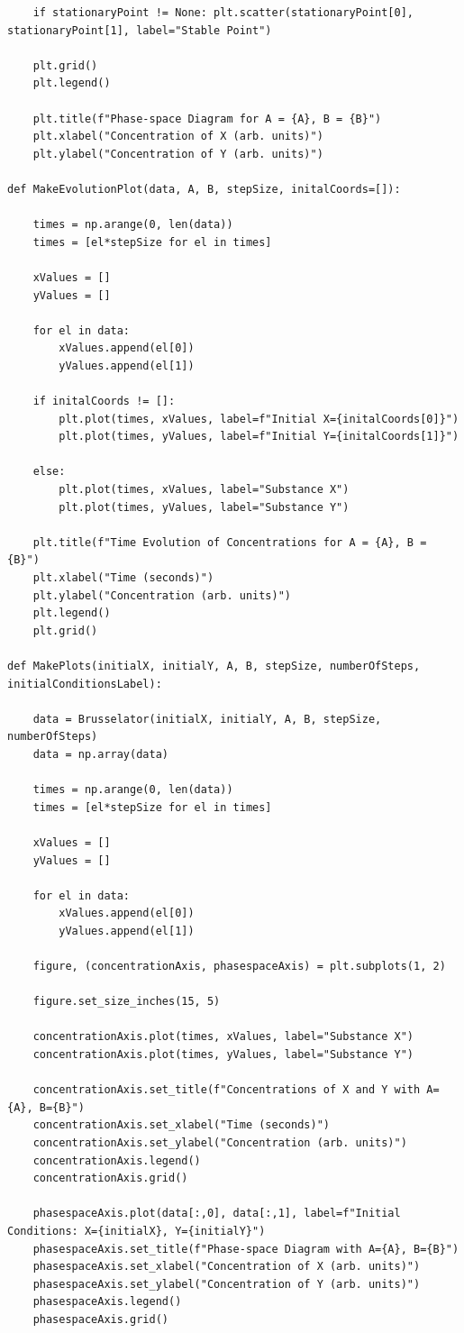 \documentclass[reprint, amsmath, amssymb, aps]{revtex4-2}
\begin{document}
\begin{lstlisting}
    if stationaryPoint != None: plt.scatter(stationaryPoint[0], stationaryPoint[1], label="Stable Point")

    plt.grid()
    plt.legend()

    plt.title(f"Phase-space Diagram for A = {A}, B = {B}")
    plt.xlabel("Concentration of X (arb. units)")
    plt.ylabel("Concentration of Y (arb. units)")
    
def MakeEvolutionPlot(data, A, B, stepSize, initalCoords=[]):
    
    times = np.arange(0, len(data))
    times = [el*stepSize for el in times]

    xValues = []
    yValues = []

    for el in data:
        xValues.append(el[0])
        yValues.append(el[1])

    if initalCoords != []:
        plt.plot(times, xValues, label=f"Initial X={initalCoords[0]}")
        plt.plot(times, yValues, label=f"Initial Y={initalCoords[1]}")

    else:
        plt.plot(times, xValues, label="Substance X")
        plt.plot(times, yValues, label="Substance Y")

    plt.title(f"Time Evolution of Concentrations for A = {A}, B = {B}")
    plt.xlabel("Time (seconds)")
    plt.ylabel("Concentration (arb. units)")
    plt.legend()
    plt.grid()
    
def MakePlots(initialX, initialY, A, B, stepSize, numberOfSteps, initialConditionsLabel):
    
    data = Brusselator(initialX, initialY, A, B, stepSize, numberOfSteps)
    data = np.array(data)

    times = np.arange(0, len(data))
    times = [el*stepSize for el in times]

    xValues = []
    yValues = []

    for el in data:
        xValues.append(el[0])
        yValues.append(el[1])
    
    figure, (concentrationAxis, phasespaceAxis) = plt.subplots(1, 2)

    figure.set_size_inches(15, 5)

    concentrationAxis.plot(times, xValues, label="Substance X")
    concentrationAxis.plot(times, yValues, label="Substance Y")

    concentrationAxis.set_title(f"Concentrations of X and Y with A={A}, B={B}")
    concentrationAxis.set_xlabel("Time (seconds)")
    concentrationAxis.set_ylabel("Concentration (arb. units)")
    concentrationAxis.legend()
    concentrationAxis.grid()

    phasespaceAxis.plot(data[:,0], data[:,1], label=f"Initial Conditions: X={initialX}, Y={initialY}")
    phasespaceAxis.set_title(f"Phase-space Diagram with A={A}, B={B}")
    phasespaceAxis.set_xlabel("Concentration of X (arb. units)")
    phasespaceAxis.set_ylabel("Concentration of Y (arb. units)")
    phasespaceAxis.legend()
    phasespaceAxis.grid()
\end{lstlisting}
\end{document}
